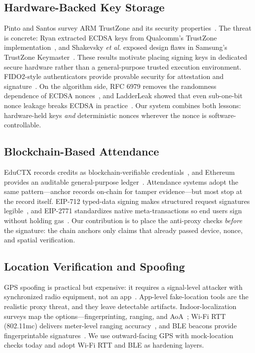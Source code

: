 \documentclass[conference]{IEEEtran}
\begin{document}
\subsection{Hardware-Backed Key Storage}
Pinto and Santos survey ARM TrustZone and its security
properties~\cite{Pinto2019Demystifying}. The threat is concrete: Ryan
extracted ECDSA keys from Qualcomm's TrustZone
implementation~\cite{Ryan2019HardwareBacked}, and Shakevsky \emph{et al.}
exposed design flaws in Samsung's TrustZone Keymaster~\cite{Shakevsky2022TrustDies}.
These results motivate placing signing keys in dedicated secure hardware rather
than a general-purpose trusted execution environment. FIDO2-style
authenticators provide provable security for attestation and
signature~\cite{Bindel2023FIDO2}. On the algorithm side, RFC 6979 removes the
randomness dependence of ECDSA nonces~\cite{pornin2013rfc6979}, and LadderLeak
showed that even sub-one-bit nonce leakage breaks ECDSA in
practice~\cite{Aranha2020LadderLeak}. Our system combines both lessons:
hardware-held keys \emph{and} deterministic nonces wherever the nonce is
software-controllable.

\subsection{Blockchain-Based Attendance}
EduCTX records credits as blockchain-verifiable
credentials~\cite{turkanovic2018eductx}, and Ethereum provides an auditable
general-purpose ledger~\cite{wood2014ethereum}. Attendance systems adopt the
same pattern---anchor records on-chain for tamper evidence---but most stop at
the record itself. EIP-712 typed-data signing makes structured request
signatures legible~\cite{eip712}, and EIP-2771 standardizes native
meta-transactions so end users sign without holding
gas~\cite{eip2771}. Our contribution is to place the anti-proxy checks
\emph{before} the signature: the chain anchors only claims that already passed
device, nonce, and spatial verification.

\subsection{Location Verification and Spoofing}
GPS spoofing is practical but expensive: it requires a signal-level attacker
with synchronized radio equipment, not an app~\cite{tippenhauer2011requirements,
wu2020spoofing}. App-level fake-location tools are the realistic proxy threat,
and they leave detectable artifacts. Indoor-localization surveys map the
options---fingerprinting, ranging, and AoA~\cite{zafari2019survey}; Wi-Fi RTT
(802.11mc) delivers meter-level ranging
accuracy~\cite{ma2022wifi}, and BLE beacons provide fingerprintable
signatures~\cite{faragher2015location}. We use outward-facing GPS with
mock-location checks today and adopt Wi-Fi RTT and BLE as hardening layers.
\end{document}
